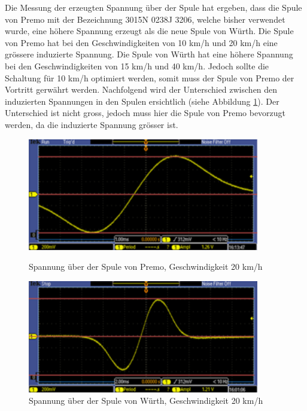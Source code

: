 Die Messung der erzeugten Spannung über der Spule hat ergeben, dass die Spule von Premo mit der Bezeichnung 3015N 0238J 3206, welche bisher verwendet wurde, eine höhere Spannung erzeugt als die neue Spule von Würth. Die Spule von Premo hat bei den Geschwindigkeiten von 10 km/h und 20 km/h eine grössere induzierte Spannung. Die Spule von Würth hat eine höhere Spannung bei den Geschwindigkeiten von 15 km/h und 40 km/h. Jedoch sollte die Schaltung für 10 km/h optimiert werden, somit muss der Spule von Premo der Vortritt gerwährt werden. Nachfolgend wird der Unterschied zwischen den induzierten Spannungen in den Spulen ersichtlich (siehe Abbildung \ref{messung_optimierung_spule}). Der Unterschied ist nicht gross, jedoch muss hier die Spule von Premo bevorzugt werden, da die induzierte Spannung grösser ist.

\begin{figure}[ht]
 \begin{minipage}[t]{0.5\textwidth}
    \includegraphics[width=0.9\textwidth]{3Vorgehen/imag/Messung_Optimierung_Spule_links.png}
    \caption{Spannung über der Spule von Premo, Geschwindigkeit 20 km/h}               
    \label{messung_optimierung_spule} 
 \end{minipage}
 \begin{minipage}[t]{0.5\textwidth}
    \includegraphics[width=0.9\textwidth]{3Vorgehen/imag/Messung_Optimierung_Spule_rechts.png}
    \caption{Spannung über der Spule von Würth, Geschwindigkeit 20 km/h}               
 \end{minipage}
\end{figure}

